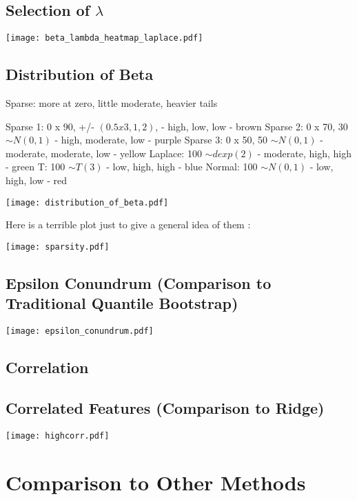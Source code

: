 \subsection{Selection of \texorpdfstring{$\lambda$}{lambda}}

\texttt{[image: beta\_lambda\_heatmap\_laplace.pdf]}

\subsection{Distribution of Beta}

Sparse: more at zero, little moderate, heavier tails

Sparse 1: 0 x 90, +/- $(0.5 x 3, 1, 2)$,
- high, low, low  - brown
Sparse 2: 0 x 70, 30 $\sim N(0, 1)$
- high, moderate, low - purple
Sparse 3: 0 x 50, 50 $\sim N(0, 1)$
- moderate, moderate, low - yellow
Laplace: 100 $\sim dexp(2)$
- moderate, high, high - green
T: 100 $\sim T(3)$
- low, high, high - blue
Normal: 100 $\sim N(0, 1)$
- low, high, low - red

\texttt{[image: distribution\_of\_beta.pdf]}

Here is a terrible plot just to give a general idea of them :

\texttt{[image: sparsity.pdf]}

\subsection{Epsilon Conundrum (Comparison to Traditional Quantile Bootstrap)}

\texttt{[image: epsilon\_conundrum.pdf]}

\subsection{Correlation}

\subsection{Correlated Features (Comparison to Ridge)}

\texttt{[image: highcorr.pdf]}

\section{Comparison to Other Methods}

